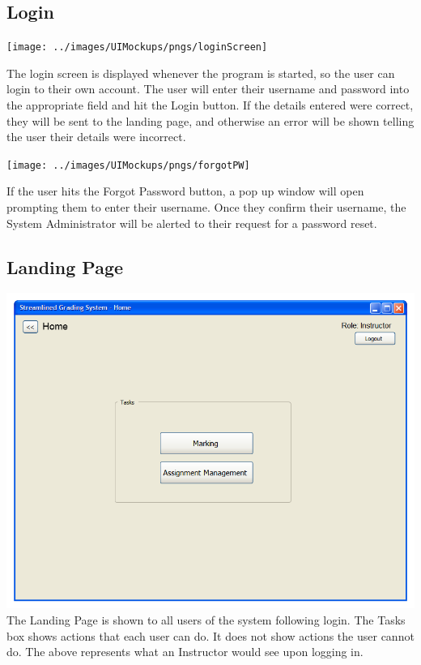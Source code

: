 \documentclass{article}
\begin{document}
\subsection{Login}
\label{login}
\centerline{\texttt{[image: ../images/UIMockups/pngs/loginScreen]}}
The login screen is displayed whenever the program is started, so the user can login
to their own account. The user will enter their username and password into the
appropriate field and hit the Login button. If the details entered were correct,
they will be sent to the landing page, and otherwise an error will be shown telling
the user their details were incorrect.\\
\centerline{\texttt{[image: ../images/UIMockups/pngs/forgotPW]}}
If the user hits the Forgot Password button, a pop up window will open prompting
them to enter their username. Once they confirm their username, the System 
Administrator will be alerted to their request for a password reset.

\subsection{Landing Page}
\includegraphics[scale=0.55]{../images/UIMockups/pngs/LandingPage} 
\label{landPg}\\
The Landing Page is shown to all users of the system following login.  The Tasks
box shows actions that each user can do.  It does not show actions the user
cannot do. The above represents what an Instructor would see upon logging in.
\end{document}
